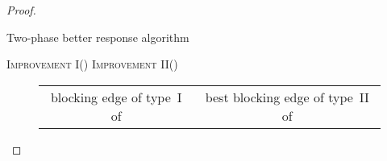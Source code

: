 \documentclass{llncs}
\begin{document}
\begin{proof}
\begin{algorithm}[H]
\renewcommand{\thealgorithm}{} \caption{Two-phase better response algorithm}
\label{alg:two_ph}
\begin{algorithmic}
	\State \textsc{Improvement I}()
\EndWhile
{}
	\State \textsc{Improvement II}()
\EndWhile
\end{algorithmic}
\end{algorithm}


\begin{algorithmic}
\begin{figure}[H]
\centering
\begin{tabular}[H]{cc}
\begin{minipage}[t]{3.0 in}
\Procedure{Improvement I}{}
	\State  blocking edge of type~I of 
	\If{}
		\State  
		\State  
		\State  
	\Else
		\State  
		\State  
		\State  
		\State  
	\EndIf
\EndProcedure
\end{minipage}&

\hfill
\begin{minipage}[t]{3.0 in}
\Procedure{Improvement II}{}
	\State  best blocking edge of type~II of 
	\If{}
		\State  
		\State  		
	\Else
		\State  
		\State  
		\State  
	\EndIf
\EndProcedure
\end{minipage}
\end{tabular}
\end{figure}
\end{algorithmic}

\end{proof}
\end{document}
